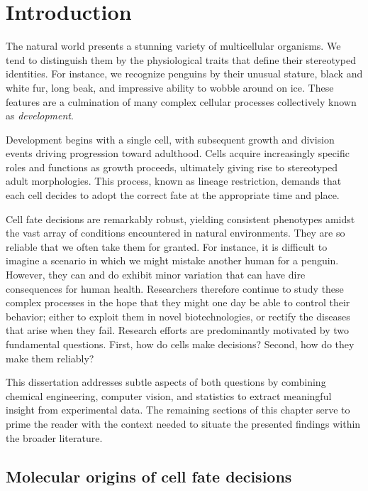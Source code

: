 \chapter{Introduction}

The natural world presents a stunning variety of multicellular organisms. We tend to distinguish them by the physiological traits that define their stereotyped identities. For instance, we recognize penguins by their unusual stature, black and white fur, long beak, and impressive ability to wobble around on ice. These features are a culmination of many complex cellular processes collectively known as \emph{development}.

Development begins with a single cell, with subsequent growth and division events driving progression toward adulthood. Cells acquire increasingly specific roles and functions as growth proceeds, ultimately giving rise to stereotyped adult morphologies. This process, known as lineage restriction, demands that each cell decides to adopt the correct fate at the appropriate time and place.

Cell fate decisions are remarkably robust, yielding consistent phenotypes amidst the vast array of conditions encountered in natural environments. They are so reliable that we often take them for granted. For instance, it is difficult to imagine a scenario in which we might mistake another human for a penguin. However, they can and do exhibit minor variation that can have dire consequences for human health. Researchers therefore continue to study these complex processes in the hope that they might one day be able to control their behavior; either to exploit them in novel biotechnologies, or rectify the diseases that arise when they fail. Research efforts are predominantly motivated by two fundamental questions. First, how do cells make decisions? Second, how do they make them reliably? 

This dissertation addresses subtle aspects of both questions by combining chemical engineering, computer vision, and statistics to extract meaningful insight from experimental data. The remaining sections of this chapter serve to prime the reader with the context needed to situate the presented findings within the broader literature. 

\section{Molecular origins of cell fate decisions}

